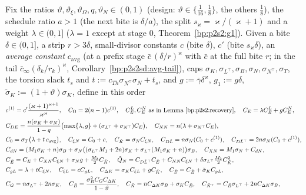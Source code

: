 \begin{definition}\label{bp:p2s2:constantsB}
Fix the ratios $\vartheta,\vartheta_\xi,\vartheta_\Omega,q,\vartheta_N\in(0,1)$ (design: $\vartheta\in\{\frac1{16},\frac18\}$, the others $\frac18$), the schedule ratio $a>1$
(the next bite is $\delta/a$), the split $s_\varkappa=\varkappa/(\varkappa+1)$ and a weight $\lambda\in(0,1]$ ($\lambda=1$ except at stage $0$,
Theorem~\ref{bp:p2s2:g1}). Given a bite $\delta\in(0,1]$, a strip $r>3\delta$, small-divisor constants $c$ (bite $\delta$), $c'$ (bite
$s_\varkappa\delta$), an \emph{average constant} $c_{\mathrm{avg}}$ (at a prefix stage $\bar c\,(\delta/r)^\varkappa$ with $\bar c$ at the full bite $r$; in
the tail $\bar c_\infty(\delta_k/r_k)^\varkappa$, Corollary~\ref{bp:p2s2sd:avg-tail}), caps $\sigma_K,\sigma_{L^\top},\sigma_B,\sigma_N,\sigma_{N^\top},\sigma_T$, the
torsion slack $t_s$ and $t:=c_{Th}\sigma_{N^\top}\sigma_N+t_s$, and $g:=\bar\gamma\delta^\varkappa$, $g_1:=g\delta$, $\tilde\sigma_K:=(1+\vartheta)\sigma_K$, define in
this order
\begin{align*}
&c^{(1)}=c'\frac{(\varkappa+1)^{\varkappa+1}}{\varkappa^\varkappa},\quad C_\Omega=2(n-1)c^{(1)},\quad C^L_E,C^N_E\text{ as in Lemma~\ref{bp:p2s2:recovery}},\quad C_E=\lambda C^L_E+gC^N_E,\\
&C_{DE}=\frac{n(\sigma_K+\sigma_N)}{1-q}\bigl(\max\{\lambda,g\}+(\sigma_{L^\top}+\sigma_{N^\top})C_E\bigr),\quad C_{NN}=n(\lambda+\sigma_{N^\top}C_E),\\
&C_0=\sigma_T\bigl(\lambda+t\,c_{\mathrm{avg}}\bigr),\quad C_{\xi N}=C_0+c,\quad C_{\tilde K}=\sigma_NC_{\xi N},\quad C_{D\tilde L}=n\sigma_N(C_0+c^{(1)}),\quad
C_{D\tilde L^\top}=2n\sigma_N(C_0+c^{(1)}),\\
&C_{dN}=(M_1\sigma_K+n)\sigma_B+\sigma_N\bigl((\sigma_{L^\top}M_1+2n)\sigma_K+\sigma_{L^\top}(M_1\sigma_K+n)\bigr)\sigma_B,\quad C_{XN}=M_1\sigma_N+C_{dN},\\
&C_{\tilde E}=C_E+C_{XN}C_{\xi N}+\sigma_Ng+\tfrac{M_2}2C_{\tilde K},\quad
\tilde Q_N=C_{D\tilde L^\top}C_{\tilde E}+C_{NN}C_{\xi N}+\delta\sigma_{L^\top}\tfrac{M_2}2C_{\tilde K}^2,\\
&C_{gL}=\lambda+tC_{\xi N},\quad C_{\xi L}=cC_{gL},\quad C_{\Delta K}=\sigma_KC_{\xi L}+gC_{\tilde K},\quad C_{\bar E}=C_{\tilde E}+\tilde\sigma_KC_{gL},\\
&C_G=n\sigma_{L^\top}+2n\sigma_K,\quad C_{\bar B}=\frac{\sigma_B^2C_GC_{\Delta K}}{1-\vartheta},\quad C_{\bar N}=nC_{\Delta K}\sigma_B+\sigma_KC_{\bar B},\quad
C_{\bar N^\top}=C_{\bar B}\sigma_{L^\top}+2nC_{\Delta K}\sigma_B,\\

\end{align*}
\end{definition}
